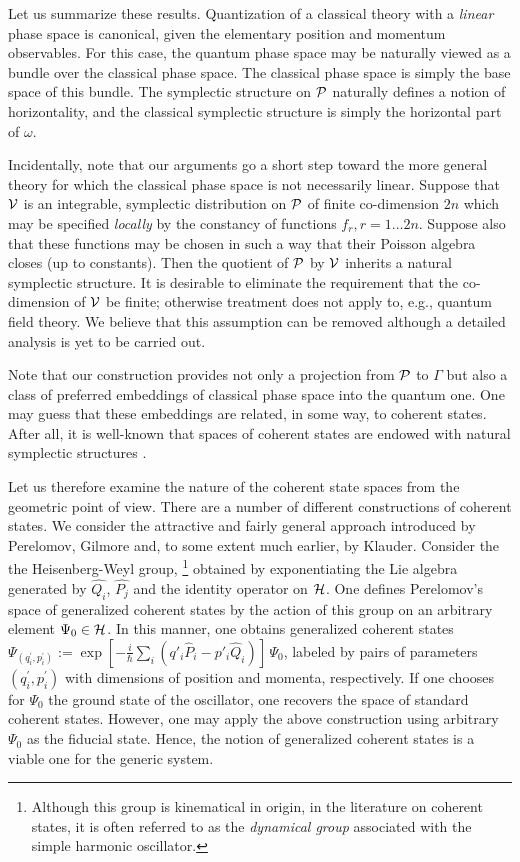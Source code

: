 \documentclass[12pt,aps,eqsecnum,tighten]{revtex4-2}
\def\H{{\cal H}}
\def\P{{\cal P}}
\def\w{\omega}
\begin{document}
Let us summarize these results.  Quantization of a classical theory
with a {\em linear} phase space is canonical, given the elementary
position and momentum observables.  For this case, the quantum phase
space may be naturally viewed as a bundle over the classical phase
space.  The classical phase space is simply the base space of this
bundle.  The symplectic structure on $\P$ naturally defines a notion
of horizontality, and the classical symplectic structure is simply the
horizontal part of $\w$.

Incidentally, note that our arguments go a short step toward the more
general theory for which the classical phase space is not necessarily
linear.  Suppose that ${\cal V}$ is an integrable, symplectic
distribution on $\P$ of finite co-dimension $2n$ which may be
specified {\em locally} by the constancy of functions $f_r, r=1 \ldots
2n$.  Suppose also that these functions may be chosen in such a way
that their Poisson algebra closes (up to constants).  Then the
quotient of $\P$ by ${\cal V}$ inherits a natural symplectic
structure.  It is desirable to eliminate the requirement that the
co-dimension of ${\cal V}$ be finite; otherwise treatment does not
apply to, e.g., quantum field theory.  We believe that this assumption
can be removed although a detailed analysis is yet to be carried out.

Note that our construction provides not only a projection from $\P$ to
$\Gamma$ but also a class of preferred embeddings of classical phase
space into the quantum one.  One may guess that these embeddings are
related, in some way, to coherent states.  After all, it is well-known
that spaces of coherent states are endowed with natural symplectic
structures \cite{zhang,perelomov}.

Let us therefore examine the nature of the coherent state spaces from
the geometric point of view.  There are a number of different
constructions of coherent states.  We consider the attractive and
fairly general approach introduced by Perelomov\cite{perelomov1},
Gilmore\cite{gilmore} and, to some extent much earlier, by
Klauder\cite{klauder}. Consider the the Heisenberg-Weyl group,%
%
\footnote{Although this group is kinematical in origin, in
the literature on coherent states, it is often referred to as the
{\em dynamical group} associated with the simple harmonic oscillator.}
%
obtained by exponentiating the Lie algebra generated by $\hat{Q_i}$,
$\hat{P_j}$ and the identity operator on $\H$.  One defines
Perelomov's space of generalized coherent states by the action of this
group on an arbitrary element $\Psi_0 \in \H$. In this manner, one
obtains generalized coherent states $\Psi_{(q^\prime_i, p^\prime_i)}
:= \exp[ -\frac{i}{\hbar}\sum_i(q'_i\hat{P}_i - p'_i\hat{Q}_i)]\, \Psi_0$,
labeled by pairs of parameters $(q^\prime_i, p^\prime_i)$ with
dimensions of position and momenta, respectively.  If one chooses for
$\Psi_0$ the ground state of the oscillator, one recovers the space of
standard coherent states.  However, one may apply the above
construction using arbitrary $\Psi_0$ as the fiducial state. Hence,
the notion of generalized coherent states is a viable one for the
generic system.
\end{document}
